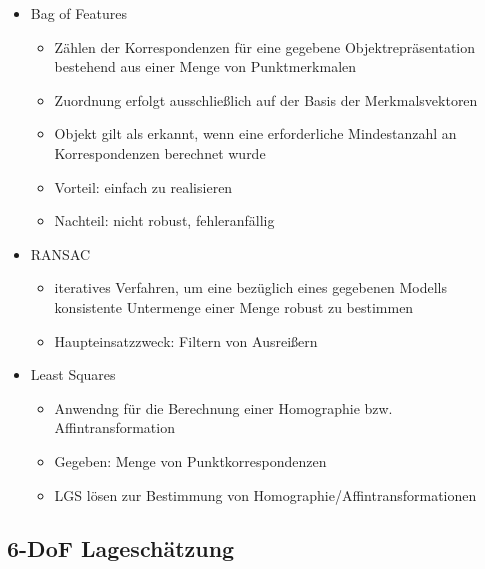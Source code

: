\documentclass[paper=a4, fontsize=11pt]{scrartcl} %
\numberwithin{equation}{section} %
\numberwithin{figure}{section} %
\numberwithin{table}{section} %
\begin{document}
\begin{itemize}
\item Bag of Features
\begin{itemize}
\item Zählen der Korrespondenzen für eine gegebene Objektrepräsentation bestehend aus einer Menge von Punktmerkmalen
\item Zuordnung erfolgt ausschließlich auf der Basis der Merkmalsvektoren
\item Objekt gilt als erkannt, wenn eine erforderliche Mindestanzahl an Korrespondenzen berechnet wurde
\item Vorteil: einfach zu realisieren
\item Nachteil: nicht robust, fehleranfällig
\end{itemize}
\item RANSAC
\begin{itemize}
\item iteratives Verfahren, um eine bezüglich eines gegebenen Modells konsistente Untermenge einer Menge robust zu bestimmen
\item Haupteinsatzzweck: Filtern von Ausreißern
\end{itemize}
\item Least Squares
\begin{itemize}
\item Anwendng für die Berechnung einer Homographie bzw. Affintransformation
\item Gegeben: Menge von Punktkorrespondenzen
\item LGS lösen zur Bestimmung von Homographie/Affintransformationen
\end{itemize}
\end{itemize}

\subsection{6-DoF Lageschätzung}
\end{document}
